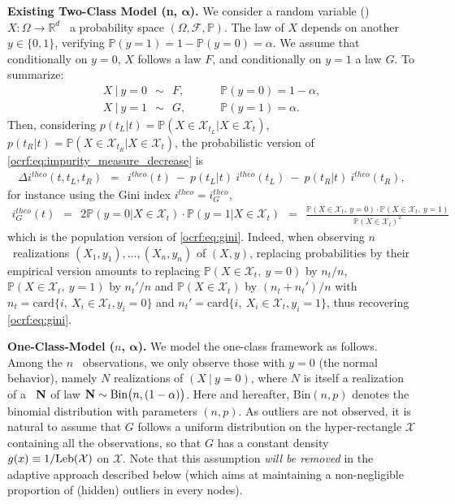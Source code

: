 \textbf{Existing Two-Class Model (n, $\boldsymbol{\alpha}$).}
We consider a random variable (\rv) $ X:\Omega \to \mathbb{R}^d$ \wrt~a probability space $(\Omega, \mathcal{F}, \mathbb{P})$.
The law of $X$ depends on another \rv~$y \in \{0,1\}$, verifying $\mathbb{P}(y=1)=1-\mathbb{P}(y=0)=\alpha$. We assume that conditionally on $y=0$, $ X$ follows a law $F$, and conditionally on $y=1$ a law $G$. To summarize:
\begin{align*}
 X ~|~ y=0 ~~\sim~~ F, &~~~~~~~~~~  \mathbb{P}(y=0)=1-\alpha, \\
 X ~|~ y=1 ~~\sim~~ G, &~~~~~~~~~~  \mathbb{P}(y=1)=\alpha.
\end{align*}
Then, considering  $p(t_L | t) = \mathbb{P}( X\in \mathcal{X}_{t_L} |  X\in \mathcal{X}_t)$,  $p(t_R | t) = \mathbb{P}( X\in \mathcal{X}_{t_R} |  X\in \mathcal{X}_t)$, the probabilistic version of \eqref{ocrf:eq:impurity_measure_decrease} is
\begin{align}
\label{ocrf:eq:impurity_measure_decrease_theo}
\Delta i^{theo}(t, t_L, t_R) ~~=~~ i^{theo}(t) ~-~  p(t_L | t)~ i^{theo}(t_L) ~-~  p(t_R | t)~ i^{theo}(t_R),
\end{align}
for instance using the Gini index $i^{theo} = i_G^{theo}$,
\begin{align}
\label{ocrf:eq:gini_theo}
  i_G^{theo}(t) ~~=~~ 2 \mathbb{P}(y=0 |  X \in \mathcal{X}_t) \cdot \mathbb{P}(y=1 |  X \in \mathcal{X}_t)
 ~~=~~ \frac{\mathbb{P}(X \in \mathcal{X}_t,~ y = 0) \cdot \mathbb{P}(X \in \mathcal{X}_t,~ y = 1) }{\mathbb{P}(X \in \mathcal{X}_t)^2}
\end{align}
which is the population version of \eqref{ocrf:eq:gini}.
Indeed,
when observing $n$ \iid~realizations $( X_1, y_1),\ldots, ( X_n, y_n)$ of $( X,y)$, replacing probabilities by their empirical version amounts to replacing $\mathbb{P}(X \in \mathcal{X}_t,~ y = 0)$ by $n_t / n$, $\mathbb{P}(X \in \mathcal{X}_t,~ y = 1)$ by $n_t'/n$ and $\mathbb{P}(X \in \mathcal{X}_t)$ by $(n_t + n_t')/n$ with $n_t = \text{card}\{i,~X_i\in \mathcal{X}_t, y_i=0 \}$ and $n_t' = \text{card}\{i,~X_i\in \mathcal{X}_t, y_i=1 \}$, thus recovering \eqref{ocrf:eq:gini}.

\textbf{One-Class-Model ($n$, $\boldsymbol{\alpha}$).}
We model the one-class framework as follows. Among the $n$ \iid~observations, we only observe those with $y=0$ (the normal behavior), namely $N$ realizations of $( X ~|~ y=0)$, where $N$ is itself a realization of a \rv~$\mathbf N$ of law $\mathbf N \sim \text{Bin}\big(n, (1-\alpha)\big)$. Here and hereafter, $\text{Bin}(n, p)$ denotes the binomial distribution with parameters $(n, p)$. As outliers are not observed, it is natural to assume that $G$ follows a uniform distribution on the hyper-rectangle $\mathcal{X}$ containing all the observations, so that $G$ has a constant density $g(x) \equiv 1 / \text{Leb}(\mathcal{X})$ on $\mathcal{X}$. %
Note that this assumption \emph{will be removed} in the adaptive approach described below (which aims at maintaining a non-negligible proportion of (hidden) outliers in every nodes).

